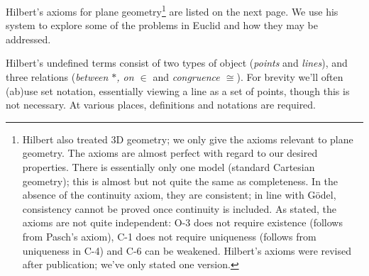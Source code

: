 Hilbert's axioms for plane geometry\footnote{Hilbert also treated 3D geometry; we only give the axioms relevant to plane geometry. The axioms are almost perfect with regard to our desired properties. There is essentially only one model (standard Cartesian geometry); this is almost but not quite the same as completeness. In the absence of the continuity axiom, they are consistent; in line with Gödel, consistency cannot be proved once continuity is included. As stated, the axioms are not quite independent: O-3 does not require existence (follows from Pasch's axiom), C-1 does not require uniqueness (follows from uniqueness in C-4) and C-6 can be weakened. Hilbert's axioms were revised after publication; we've only stated one version.} are listed on the next page. We use his system to explore some of the problems in Euclid and how they may be addressed.\smallbreak


Hilbert's undefined terms consist of two types of object (\emph{points} and \emph{lines}), and three relations (\emph{between $*$, on $\in$} and \emph{congruence $\cong$}). For brevity we'll often (ab)use set notation, essentially viewing a line as a set of points, though this is not necessary. At various places, definitions and notations are required.


